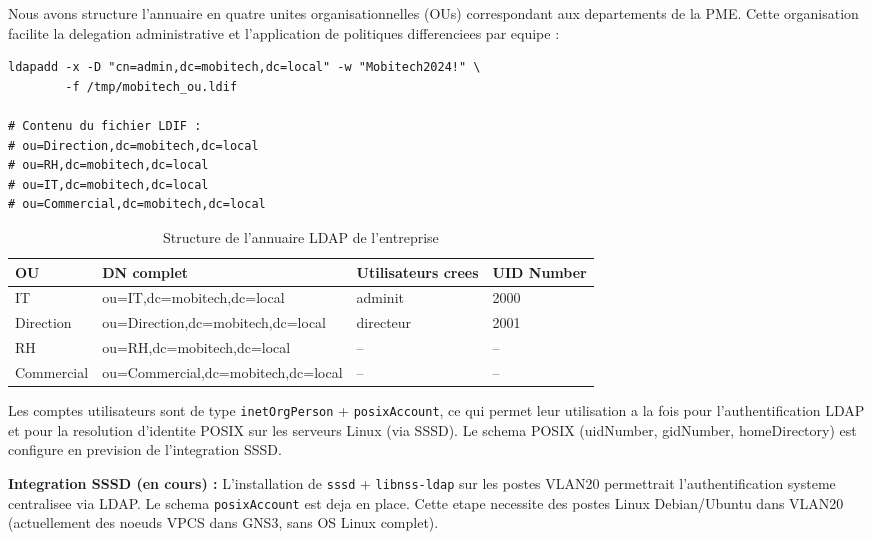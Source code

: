 \documentclass[11pt,a4paper]{article}
\begin{document}
Nous avons structure l'annuaire en quatre unites organisationnelles (OUs) correspondant aux departements de la PME. Cette organisation facilite la delegation administrative et l'application de politiques differenciees par equipe :

\begin{lstlisting}[caption={Creation des OUs dans l'annuaire LDAP}]
ldapadd -x -D "cn=admin,dc=mobitech,dc=local" -w "Mobitech2024!" \
        -f /tmp/mobitech_ou.ldif

# Contenu du fichier LDIF :
# ou=Direction,dc=mobitech,dc=local
# ou=RH,dc=mobitech,dc=local
# ou=IT,dc=mobitech,dc=local
# ou=Commercial,dc=mobitech,dc=local
\end{lstlisting}

\begin{table}[H]
\centering
\begin{tabular}{@{}llll@{}}
\toprule
\textbf{OU} & \textbf{DN complet} & \textbf{Utilisateurs crees} & \textbf{UID Number} \\
\midrule
IT & ou=IT,dc=mobitech,dc=local & adminit & 2000 \\
Direction & ou=Direction,dc=mobitech,dc=local & directeur & 2001 \\
RH & ou=RH,dc=mobitech,dc=local & -- & -- \\
Commercial & ou=Commercial,dc=mobitech,dc=local & -- & -- \\
\bottomrule
\end{tabular}
\caption{Structure de l'annuaire LDAP de l'entreprise}
\label{tab:ldap-ous}
\end{table}

Les comptes utilisateurs sont de type \texttt{inetOrgPerson} + \texttt{posixAccount}, ce qui permet leur utilisation a la fois pour l'authentification LDAP et pour la resolution d'identite POSIX sur les serveurs Linux (via SSSD). Le schema POSIX (uidNumber, gidNumber, homeDirectory) est configure en prevision de l'integration SSSD.

\begin{tcolorbox}[colback=softbg,colframe=codeframe,arc=4pt,boxrule=0.5pt,
  left=8pt,right=8pt,top=6pt,bottom=6pt,before skip=0.5em,after skip=0.5em]
\textbf{Integration SSSD (en cours) :} L'installation de \texttt{sssd} + \texttt{libnss-ldap} sur les postes VLAN20 permettrait l'authentification systeme centralisee via LDAP. Le schema \texttt{posixAccount} est deja en place. Cette etape necessite des postes Linux Debian/Ubuntu dans VLAN20 (actuellement des noeuds VPCS dans GNS3, sans OS Linux complet).
\end{tcolorbox}
\end{document}

